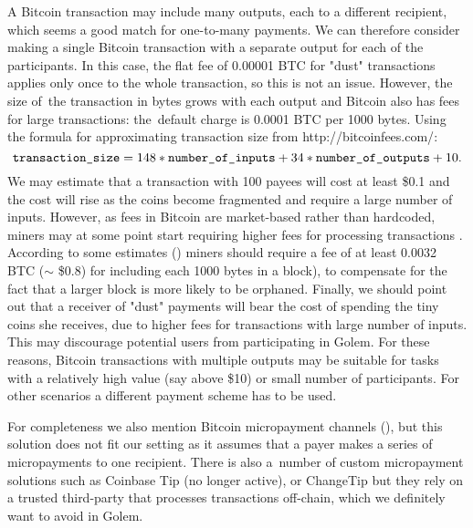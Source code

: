 \documentclass[a4paper]{article}
\begin{document}
    A Bitcoin transaction may include many outputs, each to a different recipient, which seems a good match for
    one-to-many payments. We can therefore consider making a single Bitcoin transaction with a separate output
    for each of the participants. In this case, the flat fee of 0.00001 BTC for "dust" transactions applies only
    once to the whole transaction, so this is not an issue. However, the size of~the transaction in bytes grows with
    each output and Bitcoin also has fees for large transactions: the~default charge is 0.0001 BTC per 1000 bytes.
    Using the formula for approximating transaction size from http://bitcoinfees.com/\cite{BITFEE}:
    \begin{displaymath}
	    \text{\texttt{transaction\_size}} = 148 * \text{\texttt{number\_of\_inputs}} +
	    34 * \text{\texttt{number\_of\_outputs}} + 10.
	\end{displaymath}
    We may estimate that a transaction with 100 payees will cost at least \$0.1 and the cost will rise as the coins
    become fragmented and require a large number of inputs. However, as fees in Bitcoin are market-based rather than
    hardcoded, miners may at some point start requiring higher fees for processing transactions \cite{KASKALOGLU}.
    According to some estimates (\cite{ANDRESEN}) miners should require a fee of
    at least 0.0032 BTC ($\sim$ \$0.8) for including each 1000 bytes in a block), to compensate for the fact that
    a larger block is more likely to be orphaned. Finally, we should point out that a receiver of "dust" payments will
    bear the cost of spending the tiny coins she receives, due to higher fees for transactions with large number of
    inputs. This may discourage potential users from participating in Golem. For these reasons, Bitcoin transactions
    with multiple outputs may be suitable for tasks with a relatively high value (say above \$10) or small number
    of participants. For other scenarios a different payment scheme has to be used.

    For completeness we also mention Bitcoin micropayment channels (\cite{BITCOINJ}), but this solution does not fit
    our setting as it assumes that a payer makes a series of micropayments to one recipient.
    There is also a~number of custom micropayment solutions such as Coinbase Tip \cite{COINTIP}(no longer active),
    or ChangeTip \cite{CHANGETIP} but they rely on a trusted third-party that processes transactions off-chain,
    which we definitely want to avoid in Golem.
\end{document}
